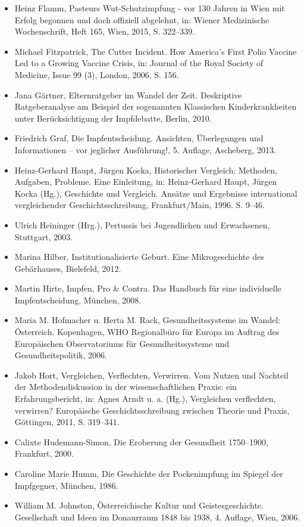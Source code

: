 \documentclass[
    a4paper,
    12pt,
    hyphens,
    chapterprefix=true,
    headheight=33pt,
    footheight=29pt,
    headings=optiontohead, %
]{scrartcl}
\begin{document}
{\begin{itemize}
\item{Heinz Flamm, Pasteurs Wut-Schutzimpfung - vor 130 Jahren in Wien mit Erfolg begonnen und doch offiziell abgelehnt, in: Wiener Medizinische Wochenschrift, Heft 165, Wien, 2015, S. 322--339.}
\item{Michael Fitzpatrick, The Cutter Incident. How America's First Polio Vaccine Led to a Growing Vaccine Crisis, in: Journal of the Royal Society of Medicine, Issue 99 (3), London, 2006, S. 156.}
\item{Jana Gärtner, Elternratgeber im Wandel der Zeit. Deskriptive Ratgeberanalyse am Beispiel der sogenannten Klassischen Kinderkrankheiten unter Berücksichtigung der Impfdebatte, Berlin, 2010.}
\item{Friedrich Graf, Die Impfentscheidung. Ansichten, Überlegungen und Informationen -- vor jeglicher Ausführung!, 5. Auflage, Ascheberg, 2013.}
\item{Heinz-Gerhard Haupt, Jürgen Kocka, Historischer Vergleich: Methoden, Aufgaben, Probleme. Eine Einleitung, in: Heinz-Gerhard Haupt, Jürgen Kocka (Hg.), Geschichte und Vergleich. Ansätze und Ergebnisse international vergleichender Geschichtsschreibung, Frankfurt/Main, 1996. S. 9--46.}
\item{Ulrich Heininger (Hrg.), Pertussis bei Jugendlichen und Erwachsenen, Stuttgart, 2003.}
\item{Marina Hilber, Institutionalisierte Geburt. Eine Mikrogeschichte des Gebärhauses, Bielefeld, 2012.}
\item{Martin Hirte, Impfen, Pro \& Contra. Das Handbuch für eine individuelle Impfentscheidung, München, 2008.}
\item{Maria M. Hofmacher u. Herta M. Rack, Gesundheitssysteme im Wandel: Österreich. Kopenhagen, WHO Regionalbüro für Europa im Auftrag des Europäischen Observatoriums für Gesundheitssysteme und Gesundheitspolitik, 2006.}

\item{Jakob Hort, Vergleichen, Verflechten, Verwirren. Vom Nutzen und Nachteil der Methodendiskussion in der wissenschaftlichen Praxis: ein Erfahrungsbericht, in: Agnes Arndt u. a. (Hg.), Vergleichen verflechten, verwirren? Europäische  Geschichtsschreibung zwischen Theorie und Praxis, Göttingen, 2011, S. 319--341.}
\item{Calixte Hudemann-Simon, Die Eroberung der Gesundheit 1750--1900, Frankfurt, 2000.}
\item{Caroline Marie Humm, Die Geschichte der Pockenimpfung im Spiegel der Impfgegner, München, 1986.}
\item{William M. Johnston, Österreichische Kultur und Geistesgeschichte. Gesellschaft und Ideen im Donaurraum 1848 bis 1938, 4. Auflage, Wien, 2006.}


\end{itemize}}
\end{document}
